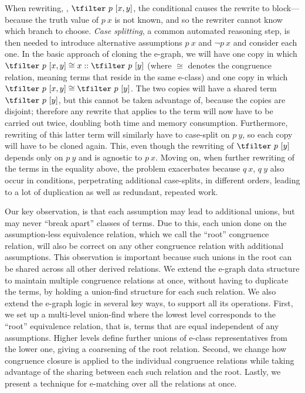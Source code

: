 When rewriting, \eg, $\tfilter~p~[x,y]$,
the conditional causes the rewrite to 
block---because the truth value of $p~x$
is not known,
and so the rewriter cannot know which branch
to choose.
\emph{Case splitting}, a common automated
reasoning step, is then needed to introduce
alternative assumptions $p~x$ and $\lnot p~x$ and consider each one.
In the basic approach of cloning the e-graph,
we will have one copy in which 
$\tfilter~p~[x,y] \cong x::\tfilter~p~[y]$
(where $\cong$ denotes the congruence relation, meaning terms that reside in the same e-class)
and one copy in which 
$\tfilter~p~[x,y] \cong \tfilter~p~[y]$.
The two copies will have a shared term
$\tfilter~p~[y]$, but this cannot be taken advantage of, because the copies are disjoint;
therefore any rewrite that applies to the term will now have to be carried out twice, doubling both time and memory consumption.
Furthermore, rewriting of this latter term will similarly have to case-split on $p~y$,
so each copy will have to be cloned again.
This, even though the rewriting of $\tfilter~p~[y]$ depends only on $p~y$ and is agnostic to $p~x$.
Moving on, when further rewriting of
the terms in the equality above, the problem exacerbates because $q~x$, $q~y$ also occur in conditions, perpetrating additional case-splits, in different orders, leading to a lot of duplication as well as redundant, repeated work.

Our key observation, is that each assumption may lead to additional unions, but may never ``break apart'' classes of terms.
Due to this, each union done on the assumption-less equivalence relation, which we call the ``root'' congruence relation, will also be correct on any other congruence relation with additional assumptions.
This observation is important because such unions in the root can be shared across all other derived relations.
We extend the e-graph data structure to maintain multiple congruence relations at once, without having to duplicate the terms, by holding a union-find structure for each such relation.
We also extend the e-graph logic in several key ways, to support all its operations.
First, we set up a multi-level union-find where the lowest level corresponds to the ``root'' equivalence relation, that is,
terms that are equal independent of any assumptions.
Higher levels define further unions of e-class representatives from the lower one,
giving a coarsening of the root relation.
Second, we change how congruence closure is applied to the individual congruence relations while taking advantage of the sharing between each such relation and the root. 
Lastly, we present a technique for e-matching over all the relations at once.

